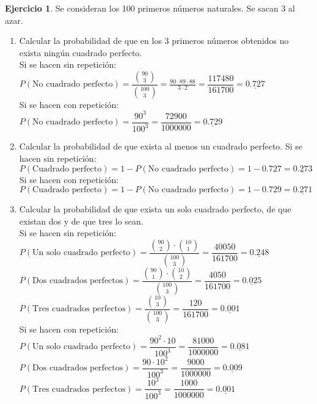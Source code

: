 \documentclass[a4paper, 12pt]{article}
\theoremstyle{definition}
\newtheorem{ej}{Ejercicio}
\begin{document}
\begin{ej}
Se consideran los 100 primeros números naturales. Se sacan 3 al azar.\\
\begin{enumerate}[label=\textit{\alph*)}]
    \item Calcular la probabilidad de que en los 3 primeros números obtenidos no exista ningún cuadrado perfecto. \\
    Si se hacen sin repetición: \\ $P(\text{No cuadrado perfecto}) = \dfrac{{90 \choose 3}}{{100 \choose 3}}  = \frac{90\cdot89\cdot88}{3\cdot2}= \dfrac{117480}{161700} = \underline{0.727}$  \\
    Si se hacen con repetición: \\  $P(\text{No cuadrado perfecto}) = \dfrac{90^3}{100^3}=\dfrac{72900}{1000000} = \underline{0.729}$
    \item Calcular la probabilidad de que exista al menos un cuadrado perfecto.
    Si se hacen sin repetición: \\ $P(\text{Cuadrado perfecto}) = 1 - P(\text{No cuadrado perfecto}) = 1 - 0.727 = \underline{0.273}$ \\
    Si se hacen con repetición: \\ $P(\text{Cuadrado perfecto}) = 1 - P(\text{No cuadrado perfecto}) = 1 - 0.729 = \underline{0.271}$
    \item Calcular la probabilidad de que exista un solo cuadrado perfecto, de que existan dos y de que tres lo sean.\\
    Si se hacen sin repetición: \\ 
    $P(\text{Un solo cuadrado perfecto}) = \dfrac{{90 \choose 2} \cdot {10 \choose 1}}{{100 \choose 3}} = \dfrac{40050}{161700} = \underline{0.248}$ \\
    $P(\text{Dos cuadrados perfectos}) = \dfrac{{90 \choose 1} \cdot {10 \choose 2}}{{100 \choose 3}} = \dfrac{4050}{161700} = \underline{0.025}$\\
    $P(\text{Tres cuadrados perfectos}) = \dfrac{{10 \choose 3}}{{100 \choose 3}} = \dfrac{120}{161700} = \underline{0.001}$\\
    Si se hacen con repetición:\\
    $P(\text{Un solo cuadrado perfecto}) = \dfrac{90^2\cdot 10}{100^3} = \dfrac{81000}{1000000} = \underline{0.081}$ \\
    $P(\text{Dos cuadrados perfectos}) = \dfrac{90 \cdot 10^2}{100^3} = \dfrac{9000}{1000000} = \underline{0.009}$\\
    $P(\text{Tres cuadrados perfectos}) = \dfrac{10^3}{100^3} = \dfrac{1000}{1000000} = \underline{0.001}$\\
    
\end{enumerate}
\end{ej}
\end{document}
